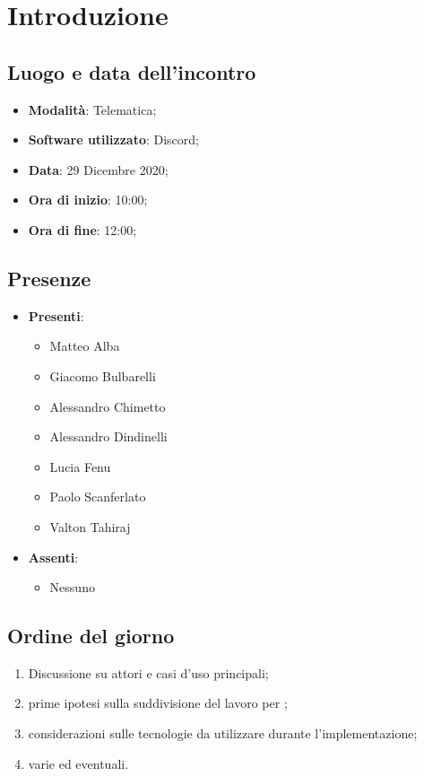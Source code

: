 \documentclass[]{article}
\begin{document}
	

	\newpage

	\section{Introduzione}
		\subsection{Luogo e data dell'incontro}
		\begin{itemize}
			\item \textbf{Modalità}: Telematica;
			\item \textbf{Software utilizzato}: Discord;
			\item \textbf{Data}: 29 Dicembre 2020;
			\item \textbf{Ora di inizio}: 10:00;
			\item \textbf{Ora di fine}: 12:00;
		\end{itemize}

		\subsection{Presenze}
		\begin{itemize}
			\item \textbf{Presenti}:
		\begin{itemize}
			\item Matteo Alba
			\item Giacomo Bulbarelli
			\item Alessandro Chimetto
			\item Alessandro Dindinelli
			\item Lucia Fenu
			\item Paolo Scanferlato
			\item Valton Tahiraj
		\end{itemize}
			\item \textbf{Assenti}:
			\begin{itemize}
				\item Nessuno
			\end{itemize}
		\end{itemize}

		\subsection{Ordine del giorno}
		\begin{enumerate}
			\item Discussione su attori e casi d'uso principali;
            \item prime ipotesi sulla suddivisione del lavoro per ;
            \item considerazioni sulle tecnologie da utilizzare durante l'implementazione;
            \item varie ed eventuali.
		\end{enumerate}
\end{document}
